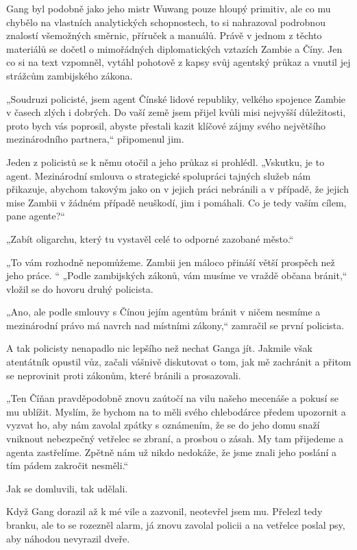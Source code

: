 Gang byl podobně jako jeho mistr Wuwang pouze hloupý primitiv, ale co mu chybělo na vlastních analytických schopnostech, to si nahrazoval podrobnou znalostí všemožných směrnic, příruček a manuálů. Právě v jednom z těchto materiálů se dočetl o mimořádných diplomatických vztazích Zambie a Číny. Jen co si na text vzpomněl, vytáhl pohotově z kapsy svůj agentský průkaz a vnutil jej strážcům zambijského zákona.

„Soudruzi policisté, jsem agent Čínské lidové republiky, velkého spojence Zambie v časech zlých i dobrých. Do vaší země jsem přijel kvůli misi nejvyšší důležitosti, proto bych vás poprosil, abyste přestali kazit klíčové zájmy svého největšího mezinárodního partnera,“ připomenul jim.

Jeden z policistů se k němu otočil a jeho průkaz si prohlédl. „Vskutku, je to agent. Mezinárodní smlouva o strategické spolupráci tajných služeb nám přikazuje, abychom takovým jako on v jejich práci nebránili a v případě, že jejich mise Zambii v žádném případě neuškodí, jim i pomáhali. Co je tedy vaším cílem, pane agente?“

„Zabít oligarchu, který tu vystavěl celé to odporné zazobané město.“

„To vám rozhodně nepomůžeme. Zambii jen máloco přináší větší prospěch než jeho práce. “
„Podle zambijských zákonů, vám musíme ve vraždě občana bránit,“ vložil se do hovoru druhý policista.

„Ano, ale podle smlouvy s Čínou jejím agentům bránit v ničem nesmíme a mezinárodní právo má navrch nad místními zákony,“ zamračil se první policista.

A tak policisty nenapadlo nic lepšího než nechat Ganga jít. Jakmile však atentátník opustil vůz, začali vášnivě diskutovat o tom, jak mě zachránit a přitom se neprovinit proti zákonům, které bránili a prosazovali.

„Ten Číňan pravděpodobně znovu zaútočí na vilu našeho mecenáše a pokusí se mu ublížit. Myslím, že bychom na to měli svého chlebodárce předem upozornit a vyzvat ho, aby nám zavolal zpátky s oznámením, že se do jeho domu snaží vniknout nebezpečný vetřelec se zbraní, a prosbou o zásah. My tam přijedeme a agenta zastřelíme. Zpětně nám už nikdo nedokáže, že jsme znali jeho poslání a tím pádem zakročit nesměli.“

Jak se domluvili, tak udělali.

Když Gang dorazil až k mé vile a zazvonil, neotevřel jsem mu. Přelezl tedy branku, ale to se rozezněl alarm, já znovu zavolal policii a na vetřelce poslal psy, aby náhodou nevyrazil dveře.


